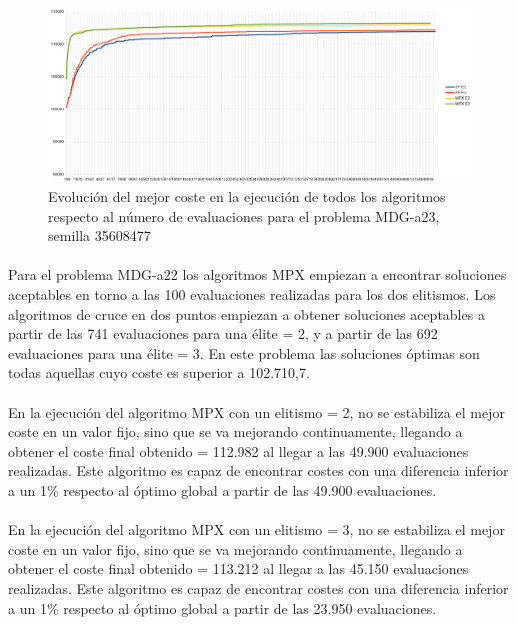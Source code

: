 	\begin{figure}[H]
		\centering
		\includegraphics[scale=0.3]{img/35608477_MDG-a_23_n2000_m200.png}
		\caption{Evolución del mejor coste en la ejecución de todos los algoritmos respecto al número de evaluaciones para el problema MDG-a23, semilla 35608477}
		\label{MDG-a_23_historico}
	\end{figure}

	\paragraph{}Para el problema MDG-a22 los algoritmos MPX empiezan a encontrar soluciones aceptables en torno a las 100 evaluaciones realizadas para los dos elitismos. Los algoritmos de cruce en dos puntos empiezan a obtener soluciones aceptables a partir de las 741 evaluaciones para una élite = 2, y a partir de las 692 evaluaciones para una élite = 3. En este problema las soluciones óptimas son todas aquellas cuyo coste es superior a 102.710,7.
	
	\paragraph{}En la ejecución del algoritmo MPX con un elitismo = 2, no se estabiliza el mejor coste en un valor fijo, sino que se va mejorando continuamente, llegando a obtener el coste final obtenido = 112.982 al llegar a las 49.900 evaluaciones realizadas. Este algoritmo es capaz de encontrar costes con una diferencia inferior a un 1\% respecto al óptimo global a partir de las 49.900 evaluaciones.
	
	\paragraph{}En la ejecución del algoritmo MPX con un elitismo = 3, no se estabiliza el mejor coste en un valor fijo, sino que se va mejorando continuamente, llegando a obtener el coste final obtenido = 113.212 al llegar a las 45.150 evaluaciones realizadas. Este algoritmo es capaz de encontrar costes con una diferencia inferior a un 1\% respecto al óptimo global a partir de las 23.950 evaluaciones.
	

